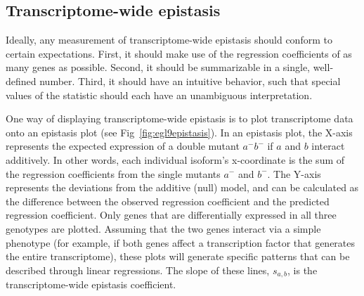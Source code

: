 \documentclass[10pt, onecolumn]{article}
\newcommand{\gene}[1]{\emph{#1}}
\newcommand{\nhr}{\emph{\mbox{nhr-57}}}
\newcommand{\egl}{\emph{\mbox{egl-9}(lf)}}
\newcommand{\rhy}{\emph{\mbox{rhy-1}(lf)}}
\newcommand{\vhl}{\emph{\mbox{vhl-1}(lf)}}
\newcommand{\eglvhl}{\emph{\mbox{egl-9(lf);vhl-1(lf)}}}
\newcommand{\eglhif}{\emph{\mbox{egl-9(lf)}~\mbox{hif-1(lf)}}}
\newcommand{\hifp}{HIF-1}
\begin{document}
%

\subsection*{Transcriptome-wide epistasis}
Ideally, any measurement of transcriptome-wide epistasis should conform to certain
expectations. First, it should make use of the regression coefficients of as
many genes as possible. Second, it should be summarizable in a single,
well-defined number. Third, it should have an intuitive behavior, such that
special values of the statistic should each have an unambiguous interpretation.

One way of displaying transcriptome-wide epistasis is to plot transcriptome data
onto an epistasis plot (see Fig~\ref{fig:egl9epistasis}). In an epistasis plot,
the X-axis represents the expected expression of a double mutant $a^-b^-$ if $a$
and $b$ interact additively.
In other words, each individual isoform's x-coordinate is the sum of the
regression coefficients from the single mutants $a^-$ and $b^-$.
The Y-axis represents the deviations from the additive (null) model, and
can be calculated as the difference between the observed regression coefficient
and the predicted regression coefficient. Only genes that are differentially
expressed in all three genotypes are plotted. Assuming that the two genes interact
via a simple phenotype (for example, if both genes affect a transcription factor
that generates the entire transcriptome), these plots will generate specific
patterns that can be described through linear regressions. The slope of these
lines, $s_{a,b}$, is the transcriptome-wide epistasis coefficient.
\end{document}
